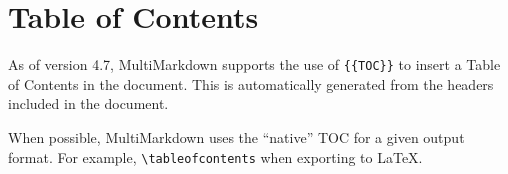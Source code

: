 
\def\mytitle{Table of Contents}
\def\myauthor{Fletcher T. Penney}
\def\revised{2018-06-27}




\tableofcontents

\section{Table of Contents }
\label{tableofcontents}

As of version 4.7, MultiMarkdown supports the use of \texttt{\{\{TOC\}\}} to insert a Table of Contents in the document. This is automatically generated from the headers included in the document.

When possible, MultiMarkdown uses the ``native'' TOC for a given output format. For example, \texttt{\textbackslash{}tableofcontents} when exporting to LaTeX.




